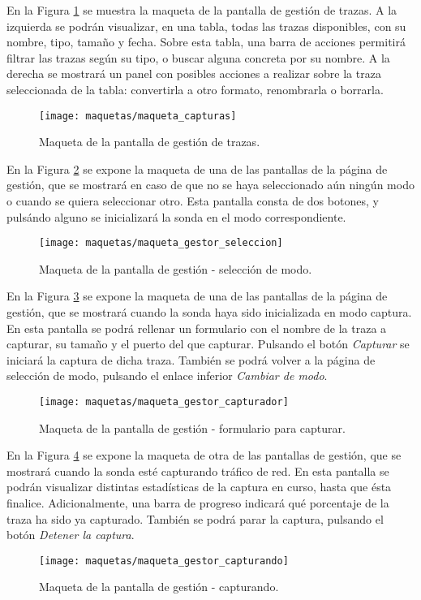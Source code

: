 En la Figura \ref{fig:maqueta:capturas} se muestra la maqueta de la pantalla de gestión de \glspl{traza}.
A la izquierda se podrán visualizar, en una tabla, todas las \glspl{traza} disponibles, con su nombre, tipo, tamaño y fecha.
Sobre esta tabla, una barra de acciones permitirá filtrar las \glspl{traza} según su tipo, o buscar alguna concreta por su nombre.
A la derecha se mostrará un panel con posibles acciones a realizar sobre la \gls{traza} seleccionada de la tabla: convertirla a otro formato, renombrarla o borrarla. 
\begin{figure}[!htp]
  \centering
  \texttt{[image: maquetas/maqueta\_capturas]}
  \caption{Maqueta de la pantalla de gestión de \glspl{traza}.}
  \label{fig:maqueta:capturas}
\end{figure}
\clearpage

En la Figura \ref{fig:maqueta:gestor_seleccion} se expone la maqueta de una de las pantallas de la página de gestión, que se mostrará en caso de que no se haya seleccionado aún ningún modo o cuando se quiera seleccionar otro.
Esta pantalla consta de dos botones, y pulsándo alguno se inicializará la sonda en el modo correspondiente.
\begin{figure}[!htp]
  \centering
  \texttt{[image: maquetas/maqueta\_gestor\_seleccion]}
  \caption{Maqueta de la pantalla de gestión - selección de modo.}
  \label{fig:maqueta:gestor_seleccion}
\end{figure}
\clearpage

En la Figura \ref{fig:maqueta:gestor_capturador} se expone la maqueta de una de las pantallas de la página de gestión, que se mostrará cuando la sonda haya sido inicializada en modo captura.
En esta pantalla se podrá rellenar un formulario con el nombre de la \gls{traza} a capturar, su tamaño y el puerto del que capturar.
Pulsando el botón \textit{Capturar} se iniciará la captura de dicha \gls{traza}. También se podrá volver a la página de selección de modo, pulsando el enlace inferior \textit{Cambiar de modo}.
\begin{figure}[!htp]
  \centering
  \texttt{[image: maquetas/maqueta\_gestor\_capturador]}
  \caption{Maqueta de la pantalla de gestión - formulario para capturar.}
  \label{fig:maqueta:gestor_capturador}
\end{figure}
\clearpage

En la Figura \ref{fig:maqueta:gestor_capturando} se expone la maqueta de otra de las pantallas de gestión, que se mostrará cuando la sonda esté capturando tráfico de red.
En esta pantalla se podrán visualizar distintas estadísticas de la captura en curso, hasta que ésta finalice.
Adicionalmente, una barra de progreso indicará qué porcentaje de la \gls{traza} ha sido ya capturado.
También se podrá parar la captura, pulsando el botón \textit{Detener la captura}.
\begin{figure}[!htp]
  \centering
  \texttt{[image: maquetas/maqueta\_gestor\_capturando]}
  \caption{Maqueta de la pantalla de gestión - capturando.}
  \label{fig:maqueta:gestor_capturando}
\end{figure}
\clearpage

